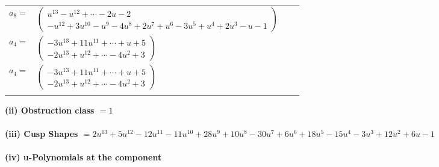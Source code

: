 \documentclass[1p]{elsarticle_modified}
\theoremstyle{definition}
\begin{document}
\begin{tabular}{m{7pt} m{180pt} m{7pt} m{180pt} }
\flushright $a_{8}=$&$\begin{pmatrix}u^{13}- u^{12}+\cdots-2 u-2\\- u^{12}+3 u^{10}- u^9-4 u^8+2 u^7+u^6-3 u^5+u^4+2 u^3- u-1\end{pmatrix}$ \\
\flushright $a_{4}=$&$\begin{pmatrix}-3 u^{13}+11 u^{11}+\cdots+u+5\\-2 u^{13}+u^{12}+\cdots-4 u^2+3\end{pmatrix}$\\ \flushright $a_{4}=$&$\begin{pmatrix}-3 u^{13}+11 u^{11}+\cdots+u+5\\-2 u^{13}+u^{12}+\cdots-4 u^2+3\end{pmatrix}$\\&\end{tabular}
\flushleft \textbf{(ii) Obstruction class $= 1$}\\~\\
\flushleft \textbf{(iii) Cusp Shapes $= 2 u^{13}+5 u^{12}-12 u^{11}-11 u^{10}+28 u^9+10 u^8-30 u^7+6 u^6+18 u^5-15 u^4-3 u^3+12 u^2+6 u-1$}\\~\\
\newpage\renewcommand{\arraystretch}{1}
\flushleft \textbf{(iv) u-Polynomials at the component}\newline \\
\end{document}

